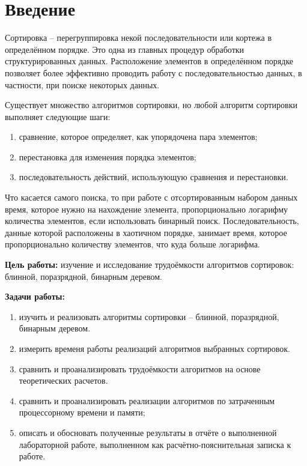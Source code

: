 \chapter*{Введение}

Сортировка -- перегруппировка некой последовательности или кортежа в определённом порядке. 
Это одна из главных процедур обработки структурированных данных. 
Расположение элементов в определённом порядке позволяет более эффективно проводить работу с последовательностью данных, в частности, при поиске некоторых данных. \newline

Существует множество алгоритмов сортировки, но любой алгоритм сортировки выполняет следующие шаги:
\begin{enumerate}[label=\arabic*)]
	\item сравнение, которое определяет, как упорядочена пара элементов;
    \item перестановка для изменения порядка элементов;
    \item последовательность действий, использующую сравнения и перестановки.
\end{enumerate}

Что касается самого поиска, то при работе с отсортированным набором данных время, которое нужно на нахождение элемента, пропорционально логарифму количества элементов, если использовать бинарный поиск. Последовательность, данные которой расположены в хаотичном порядке, занимает время, которое пропорционально количеству элементов, что куда больше логарифма.

\textbf{Цель работы:} изучение и исследование трудоёмкости алгоритмов сортировок: блинной, поразрядной, бинарным деревом.

\textbf{Задачи работы:}
\begin{enumerate}[label=\arabic*)]
	\item изучить и реализовать алгоритмы сортировки -- блинной, поразрядной, бинарным деревом.
    \item измерить временя работы реализаций алгоритмов выбранных сортировок.
    \item сравнить и проанализировать трудоёмкости алгоритмов на основе теоретических расчетов.
    \item сравнить и проанализировать реализации алгоритмов по затраченным процессорному времени и памяти;
	\item описать и обосновать полученные результаты в отчёте о выполненной лабораторной работе, выполненном как расчётно-пояснительная записка к работе.
\end{enumerate}